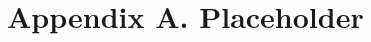 \documentclass[12pt]{article}
\begin{document}






\clearpage

\section*{Appendix A. Placeholder} \label{sec:appendixa}
\end{document}

